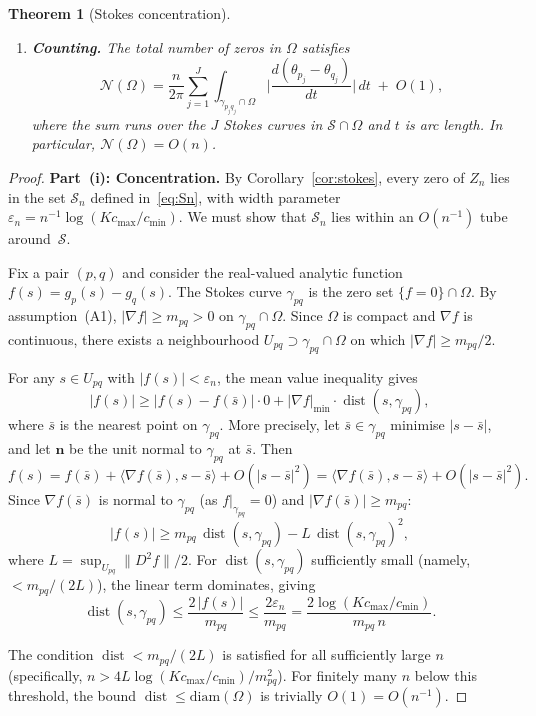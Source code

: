 \documentclass[12pt]{article}
\newtheorem{theorem}{Theorem}
\theoremstyle{definition}
\theoremstyle{remark}
\newcommand{\dist}{\operatorname{dist}}
\begin{document}
\begin{theorem}[Stokes concentration]
\begin{enumerate}
\item[\textup{(iii)}] \textbf{Counting.}
The total number of zeros in $\Omega$ satisfies
\[
\mathcal{N}(\Omega) = \frac{n}{2\pi} \sum_{j=1}^{J}
\int_{\gamma_{p_j q_j} \cap \Omega}
\bigg|\frac{d(\theta_{p_j} - \theta_{q_j})}{dt}\bigg|\,dt
\;+\; O(1),
\]
where the sum runs over the $J$ Stokes curves in
$\mathcal{S} \cap \Omega$ and $t$ is arc length.
In particular, $\mathcal{N}(\Omega) = O(n)$.
\end{enumerate}
\end{theorem}

\begin{proof}
\textbf{Part~(i): Concentration.}
By Corollary~\ref{cor:stokes}, every zero of $Z_n$ lies in the set
$\mathcal{S}_n$ defined in~\eqref{eq:Sn}, with width parameter
$\varepsilon_n = n^{-1}\log(Kc_{\max}/c_{\min})$.  We must show that
$\mathcal{S}_n$ lies within an $O(n^{-1})$ tube around~$\mathcal{S}$.

Fix a pair $(p,q)$ and consider the real-valued analytic function
$f(s) = g_p(s) - g_q(s)$.  The Stokes curve $\gamma_{pq}$ is the
zero set $\{f = 0\} \cap \Omega$.  By assumption~(A1),
$|\nabla f| \geq m_{pq} > 0$ on $\gamma_{pq} \cap \Omega$.
Since $\Omega$ is compact and $\nabla f$ is continuous, there exists
a neighbourhood $U_{pq} \supset \gamma_{pq} \cap \Omega$ on which
$|\nabla f| \geq m_{pq}/2$.

For any $s \in U_{pq}$ with $|f(s)| < \varepsilon_n$, the mean value
inequality gives
\[
|f(s)| \geq |f(s) - f(\bar s)| \cdot 0 + |\nabla f|_{\min} \cdot
\dist(s, \gamma_{pq}),
\]
where $\bar s$ is the nearest point on $\gamma_{pq}$.  More precisely,
let $\bar s \in \gamma_{pq}$ minimise $|s - \bar s|$, and let
$\mathbf{n}$ be the unit normal to $\gamma_{pq}$ at $\bar s$.  Then
\[
f(s) = f(\bar s) + \langle \nabla f(\bar s), s - \bar s \rangle
+ O(|s - \bar s|^2)
= \langle \nabla f(\bar s), s - \bar s \rangle + O(|s-\bar s|^2).
\]
Since $\nabla f(\bar s)$ is normal to $\gamma_{pq}$ (as
$f|_{\gamma_{pq}} = 0$) and $|\nabla f(\bar s)| \geq m_{pq}$:
\[
|f(s)| \geq m_{pq}\,\dist(s, \gamma_{pq}) - L\,\dist(s, \gamma_{pq})^2,
\]
where $L = \sup_{U_{pq}} \|D^2 f\|/2$.  For $\dist(s, \gamma_{pq})$
sufficiently small (namely, $< m_{pq}/(2L)$), the linear term
dominates, giving
\[
\dist(s, \gamma_{pq}) \leq \frac{2\,|f(s)|}{m_{pq}}
\leq \frac{2\varepsilon_n}{m_{pq}} = \frac{2\log(Kc_{\max}/c_{\min})}{m_{pq}\,n}.
\]

The condition $\dist < m_{pq}/(2L)$ is satisfied for all sufficiently
large $n$ (specifically, $n > 4L\log(Kc_{\max}/c_{\min})/m_{pq}^2$).
For finitely many $n$ below this threshold, the bound
$\dist \leq \mathrm{diam}(\Omega)$ is trivially $O(1) = O(n^{-1})$.


\end{proof}
\end{document}
